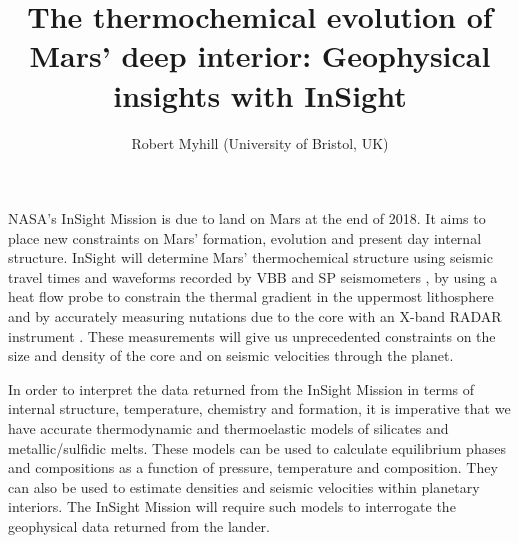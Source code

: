 \documentclass[11pt,twoside,a4paper]{article}
\date{}
\title{The thermochemical evolution of Mars' deep interior: Geophysical insights with InSight}
\author{Robert Myhill (University of Bristol, UK)}
\begin{document}
\maketitle

NASA's InSight Mission \citep{Banerdtetal2012} is due to land on Mars at the end of 2018. It aims to place new constraints on Mars' formation, evolution and present day internal structure. InSight will determine Mars' thermochemical structure using seismic travel times and waveforms \citep{KOHWDW2006, Teanby2015} recorded by VBB and SP seismometers \citep[the SEIS experiment;][]{Lognonneetal2014}, by using a heat flow probe \citep[HP3;][]{Spohnetal2012} to constrain the thermal gradient in the uppermost lithosphere and by accurately measuring nutations due to the core with an X-band RADAR instrument \citep[RISE;][]{Folkneretal2012}.  These measurements will give us unprecedented constraints on the size and density of the core and on seismic velocities through the planet. 

In order to interpret the data returned from the InSight Mission in terms of internal structure, temperature, chemistry and formation, it is imperative that we have accurate thermodynamic and thermoelastic models of silicates and metallic/sulfidic melts. These models can be used to calculate equilibrium phases and compositions as a function of pressure, temperature and composition. They can also be used to estimate densities and seismic velocities within planetary interiors. The InSight Mission will require such models to interrogate the geophysical data returned from the lander.
\end{document}
